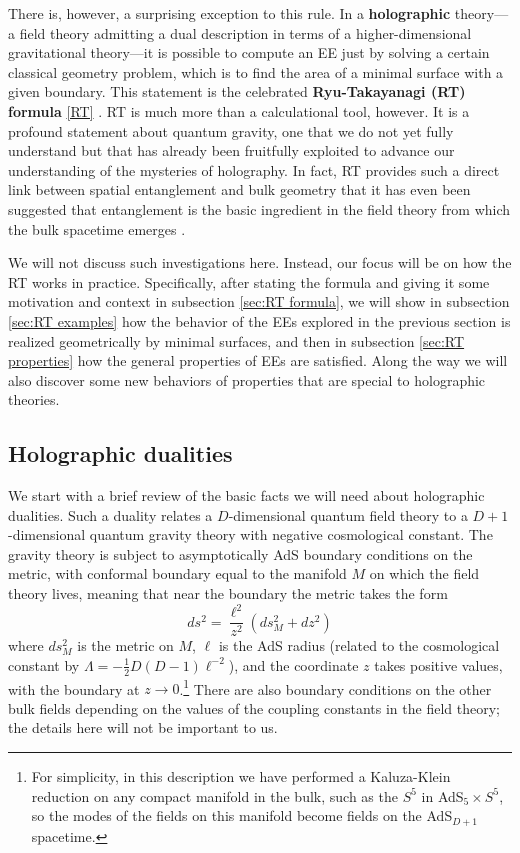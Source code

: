 \documentclass[11pt]{article}
\begin{document}
There is, however, a surprising exception to this rule. In a \textbf{holographic} theory---a field theory admitting a dual description in terms of a higher-dimensional gravitational theory---it is possible to compute an EE just by solving a certain classical geometry problem, which is to find the area of a minimal surface with a given boundary. This statement is the celebrated \textbf{Ryu-Takayanagi (RT) formula} \eqref{RT} \cite{Ryu:2006bv,Ryu:2006ef}. RT is much more than a calculational tool, however. It is a profound statement about quantum gravity, one that we do not yet fully understand but that has already been fruitfully exploited to advance our understanding of the mysteries of holography. In fact, RT provides such a direct link between spatial entanglement and bulk geometry that it has even been suggested that entanglement is the basic ingredient in the field theory from which the bulk spacetime emerges \cite{VanRaamsdonk:2010pw}.

We will not discuss such investigations here. Instead, our focus will be on how the RT works in practice. Specifically, after stating the formula and giving it some motivation and context in subsection \ref{sec:RT formula}, we will show in subsection \ref{sec:RT examples} how the behavior of the EEs explored in the previous section is realized geometrically by minimal surfaces, and then in subsection \ref{sec:RT properties} how the general properties of EEs are satisfied. Along the way we will also discover some new behaviors of properties that are special to holographic theories.


\subsection{Holographic dualities}
\label{sec:holographic}

We start with a brief review of the basic facts we will need about holographic dualities. Such a duality relates a $D$-dimensional quantum field theory to a $D+1$-dimensional quantum gravity theory with negative cosmological constant. The gravity theory is subject to asymptotically AdS boundary conditions on the metric, with conformal boundary equal to the manifold $M$ on which the field theory lives, meaning that near the boundary the metric takes the form
\begin{equation}\label{aAdS}
ds^2 = \frac{\ell^2}{z^2}\left(ds_M^2+dz^2\right)
\end{equation}
where $ds_M^2$ is the metric on $M$, $\ell$ is the AdS radius (related to the cosmological constant by $\Lambda = -\frac12D(D-1)\ell^{-2}$), and the coordinate $z$ takes positive values, with the boundary at $z\to0$.\footnote{For simplicity, in this description we have performed a Kaluza-Klein reduction on any compact manifold in the bulk, such as the $S^5$ in AdS${}_5\times S^5$, so the modes of the fields on this manifold become fields on the AdS$_{D+1}$ spacetime.} There are also boundary conditions on the other bulk fields depending on the values of the coupling constants in the field theory; the details here will not be important to us.
\end{document}
